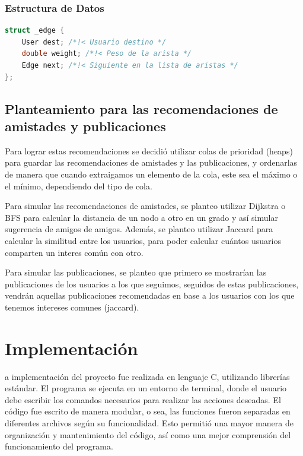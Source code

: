 \documentclass[9pt,letterpaper,onecolumn]{rho-class/rho}
\begin{document}
\subsubsection{Estructura de Datos}
\begin{lstlisting}[caption={Ejemplo de código, utilizando las normas de codificación}, label={lst:normas_codificacion}, language=C]
	struct _edge {
	User dest; /*!< Usuario destino */
	double weight; /*!< Peso de la arista */
	Edge next; /*!< Siguiente en la lista de aristas */
};
\end{lstlisting}

\subsection{Planteamiento para las recomendaciones de amistades y publicaciones}

Para lograr estas recomendaciones se decidió utilizar colas de prioridad (heaps) para guardar las recomendaciones de amistades y las publicaciones, y ordenarlas de manera que cuando extraigamos un elemento de la cola, este sea el máximo o el mínimo, dependiendo del tipo de cola.

Para simular las recomendaciones de amistades, se planteo utilizar Dijkstra o BFS para calcular la distancia de un nodo a otro en un grado y así simular sugerencia de amigos de amigos. Además, se planteo utilizar Jaccard para calcular la similitud entre los usuarios, para poder calcular cuántos usuarios comparten un interes común con otro.

Para simular las publicaciones, se planteo que primero se mostrarían las publicaciones de los usuarios a los que seguimos, seguidos de estas publicaciones, vendrán aquellas publicaciones recomendadas en base a los usuarios con los que tenemos intereses comunes (jaccard).

\newpage
\section{Implementación}

a implementación del proyecto fue realizada en lenguaje C, utilizando librerías estándar. El programa se ejecuta en un entorno de terminal, donde el usuario debe escribir los comandos necesarios para realizar las acciones deseadas. El código fue escrito de manera modular, o sea, las funciones fueron separadas en diferentes archivos según su funcionalidad. Esto permitió una mayor manera de organización y mantenimiento del código, así como una mejor comprensión del funcionamiento del programa.
\end{document}

